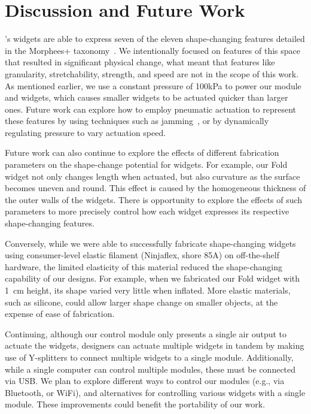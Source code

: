   \section{Discussion and Future Work}
    \mp's widgets are able to express seven of the eleven shape-changing
    features detailed in the Morphees+ taxonomy~\cite{10.1145/3173574.3174193}.
    We intentionally focused on features of this space that resulted in
    significant physical change, what meant that features like granularity,
    stretchability, strength, and speed are not in the scope of this work. As
    mentioned earlier, we use a constant pressure of 100kPa to power our module
    and widgets, which causes smaller widgets to be actuated quicker than larger
    ones. Future work can explore how to employ pneumatic actuation to represent
    these features by using techniques such as jamming~\cite{Follmer:2012}, or
    by dynamically regulating pressure to vary actuation speed.
      
    Future work can also continue to explore the effects of different
    fabrication parameters on the shape-change potential for \mp widgets. For
    example, our Fold widget not only changes length when actuated, but also
    curvature as the surface becomes uneven and round. This effect is caused by
    the homogeneous thickness of the outer walls of the widgets. There is
    opportunity to explore the effects of such parameters to more precisely
    control how each widget expresses its respective shape-changing features.
      
    Conversely, while we were able to successfully fabricate shape-changing
    widgets using consumer-level elastic filament (Ninjaflex, shore 85A) on
    off-the-shelf hardware, the limited elasticity of this material reduced the
    shape-changing capability of our designs. For example, when we fabricated
    our Fold widget with 1~cm height, its shape varied very little when
    inflated. More elastic materials, such as silicone, could allow larger shape
    change on smaller objects, at the expense of ease of fabrication.
      
    Continuing, although our control module only presents a single air output to
    actuate the widgets, designers can actuate multiple widgets in tandem by
    making use of Y-splitters to connect multiple widgets to a single module.
    Additionally, while a single computer can control multiple modules, these
    must be connected via USB. We plan to explore different ways to control our
    modules (e.g., via Bluetooth, or WiFi), and alternatives for controlling
    various widgets with a single module. These improvements could benefit the
    portability of our work.
      
